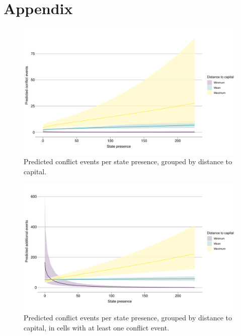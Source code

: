 \documentclass[12pt]{article}
\begin{document}

\pagebreak




\pagebreak
\section*{Appendix}









\begin{figure}[htpb]
	\centering
	\includegraphics[width=\linewidth]{"../R/Output/ggBothPlot.pdf"}
	\caption{Predicted conflict events per state presence, grouped by
	distance to capital.}
	\label{both_int}
\end{figure}

\begin{figure}[htpb]
	\centering
	\includegraphics[width=\linewidth]{"../R/Output/bothzinbplot.pdf"}
	\caption{Predicted conflict events per state presence, grouped by
	distance to capital, in cells with at least one conflict event.}
	\label{bothzinb_int}
\end{figure}
\end{document}
